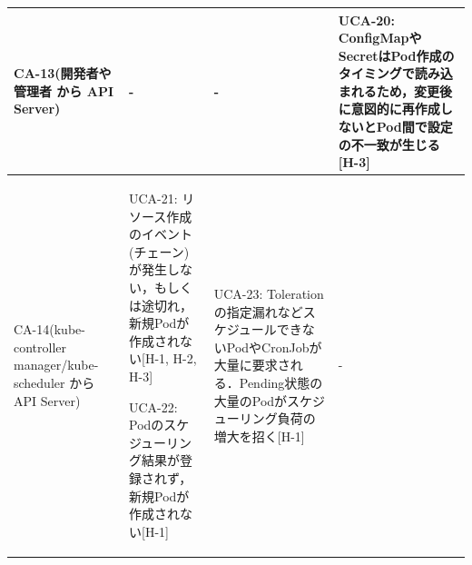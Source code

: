 \documentclass[12pt,a4j]{ujreport}
\begin{document}
\begin{footnotesize}
\begin{tabularx}{\linewidth}{
            >{\hsize=0.7\hsize}X|
            >{\hsize=1.1\hsize}X|
            >{\hsize=1.1\hsize}X|
            >{\hsize=1.1\hsize}X
        }
        CA-13(開発者や管理者 から API Server)                         & -                                                                                                                                                                                                                                                                                                                                                                                                                                                                                                          & -                                                                                                                                                                                                                                                                                                                               & UCA-20: ConfigMapやSecretはPod作成のタイミングで読み込まれるため，変更後に意図的に再作成しないとPod間で設定の不一致が生じる[H-3]     \\ \hline
        CA-14(kube-controller manager/kube-scheduler から API Server) & UCA-21: リソース作成のイベント(チェーン)が発生しない，もしくは途切れ，新規Podが作成されない[H-1, H-2, H-3]\par\noindent UCA-22: Podのスケジューリング結果が登録されず，新規Podが作成されない[H-1]                                                                                                                                                                                                                                                                                                          & UCA-23: Tolerationの指定漏れなどスケジュールできないPodやCronJobが大量に要求される．Pending状態の大量のPodがスケジューリング負荷の増大を招く[H-1]                                                                                                                                                                               & -                                                                                                                                    \\ \hline

\end{tabularx}
\end{footnotesize}
\end{document}
